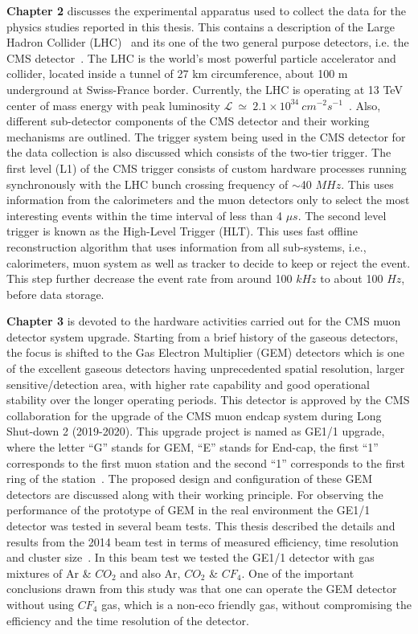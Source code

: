 \textbf{Chapter 2} discusses the experimental apparatus used to collect the data for the physics studies reported in this thesis. This contains a description of the Large Hadron Collider (LHC)~\cite{LHC-tdr-vol1,LHC-tdr-vol2,LHC-tdr-vol3} and its one of the two general purpose detectors, i.e. the CMS detector~\cite{paper:JINST:CMSCollaboration}. The LHC is the world's most powerful particle accelerator and collider, located inside a tunnel of 27 km circumference, about 100 m underground at Swiss-France border. Currently, the LHC is operating at 13 TeV center of mass energy with peak luminosity $\mathcal{L}~ \simeq ~2.1 \times 10^{34}~cm^{-2}s^{-1}$~\cite{cms-lumi-public-results,Muratori2006}. Also, different sub-detector components of the CMS detector and their working mechanisms are outlined. The trigger system being used in the CMS detector for the data collection is also discussed which consists of the two-tier trigger. The first level (L1) of the CMS trigger consists of custom hardware processes running synchronously with the LHC bunch crossing frequency of $\sim$40 $MHz$. This uses information from the calorimeters and the muon detectors only to select the most interesting events within the time interval of less than 4 $\mu s$. The second level trigger is known as the High-Level Trigger (HLT). This uses fast offline reconstruction algorithm that uses information from all sub-systems, i.e., calorimeters, muon system as well as tracker to decide to keep or reject the event. This step further decrease the event rate from around 100 $kHz$ to about 100 $Hz$, before data storage.

\textbf{Chapter 3} is devoted to the hardware activities carried out for the CMS muon detector system upgrade. Starting from a brief history of the gaseous detectors, the focus is shifted to the Gas Electron Multiplier (GEM) detectors which is one of the excellent gaseous detectors having unprecedented spatial resolution, larger sensitive/detection area, with higher rate capability and good operational stability over the longer operating periods. This detector is approved by the CMS collaboration for the upgrade of the CMS muon endcap system during Long Shut-down 2 (2019-2020). This upgrade project is named as GE1/1 upgrade, where the letter ``G'' stands for GEM, ``E'' stands for End-cap, the first ``1'' corresponds to the first muon station and the second ``1'' corresponds to the first ring of the station~\cite{Colaleo:2021453}. The proposed design and configuration of these GEM detectors are discussed along with their working principle. For observing the performance of the prototype of GEM in the real environment the GE1/1 detector was tested in several beam tests. This thesis described the details and results from the 2014 beam test in terms of measured efficiency, time resolution and cluster size~\cite{Abbaneo2015,Sharma2018}. In this beam test we tested the GE1/1 detector with gas mixtures of Ar \& $CO_2$ and also Ar, $CO_2$ \& $CF_4$. One of the important conclusions drawn from this study was that one can operate the GEM detector without using $CF_4$ gas, which is a non-eco friendly gas, without compromising the efficiency and the time resolution of the detector.

